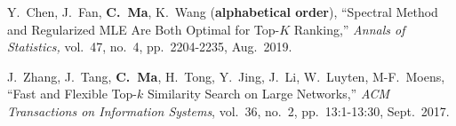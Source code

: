 \documentclass[a4paper, 10pt]{article}
\newenvironment{changemargin}[2]{%
  \begin{list}{}{%
    \setlength{\topsep}{0pt}%
    \setlength{\leftmargin}{#1}%
    \setlength{\rightmargin}{#2}%
    \setlength{\listparindent}{\parindent}%
    \setlength{\itemindent}{\parindent}%
    \setlength{\parsep}{\parskip}%
  }%
  \item[]}{\end{list}
}
\newenvironment{body} {
	\vspace*{-16pt}
	\begin{changemargin}{-0.3in}{-0.5in}
  }	
	{\end{changemargin}
}
\begin{document}
\begin{body}
\begin{enumerate}[label={[{J}{{\arabic*}}]}]
	
\item 
	Y.~Chen, J.~Fan, \textbf{C.~Ma}, K.~Wang (\textbf{alphabetical order}), {{``Spectral Method and Regularized MLE Are Both Optimal for Top-$K$ Ranking,''}} \emph{Annals of Statistics,} vol.~47, no.~4, pp.~2204-2235, Aug.~2019. \\







	
	\item J.~Zhang, J.~Tang, \textbf{C.~Ma}, H.~Tong, Y.~Jing, J.~Li, W.~Luyten, M-F.~Moens, {{``Fast and Flexible Top-$k$ Similarity Search on Large Networks,''}} \emph{ACM Transactions on Information Systems}, vol.~36, no.~2,  pp.~13:1-13:30, Sept.~2017.\\
	
\end{enumerate}
\end{body}
\end{document}
